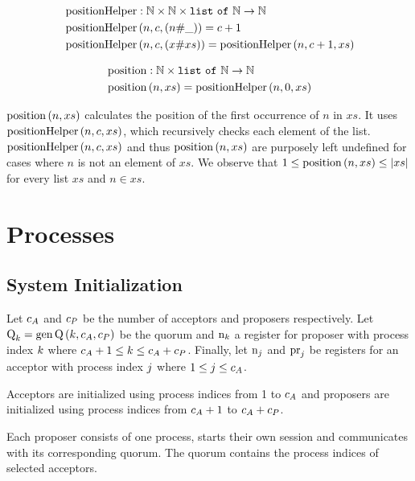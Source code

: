 \begin{align*}
&\operatorname{positionHelper} : \mathbb{N} \times \mathbb{N} \times \mathtt{list\ of\ } \mathbb{N} \to \mathbb{N}\\
&\operatorname{positionHelper}\left(n, c, \left(n \mathtt{\#} \mathtt{\_}\right)\right) = c + 1\\
&\operatorname{positionHelper}\left(n, c, \left(x \mathtt{\#} xs\right)\right) = \operatorname{positionHelper}\left(n, c + 1, xs\right)
\end{align*}

\begin{align*}
&\operatorname{position} : \mathbb{N} \times \mathtt{list\ of\ } \mathbb{N} \to \mathbb{N}\\
&\operatorname{position}\left(n, xs\right) = \operatorname{positionHelper}\left(n, 0, xs\right)
\end{align*}

$\operatorname{position}\left(n, xs\right)$ calculates the position of the first occurrence of $n$ in $xs$.
It uses $\operatorname{positionHelper}\left(n, c, xs\right)$, which recursively checks each element of the list.
$\operatorname{positionHelper}\left(n, c, xs\right)$ and thus $\operatorname{position}\left(n, xs\right)$ are purposely left undefined for cases where $n$ is not an element of $xs$.
We observe that $1 \leq \operatorname{position}\left(n, xs\right) \leq |xs|$ for every list $xs$ and $n \in xs$.

\section{Processes}
\subsection{System Initialization}
Let $c_A$ and $c_P$ be the number of acceptors and proposers respectively.
Let $\operatorname{Q}_{k} = \operatorname{gen\operatorname{Q}}\left(k, c_A, c_P\right)$ be the quorum and $\operatorname{n}_{k}$ a register for proposer with process index $k$ where $c_A + 1 \leq k \leq c_A + c_P$.
Finally, let $\operatorname{n}_{j}$ and $\operatorname{pr}_{j}$ be registers for an acceptor with process index $j$ where $1 \leq j \leq c_A$.

Acceptors are initialized using process indices from 1 to $c_A$ and proposers are initialized using process indices from $c_A + 1$ to $c_A + c_P$.

Each proposer consists of one process, starts their own session and communicates with its corresponding quorum.
The quorum contains the process indices of selected acceptors.

